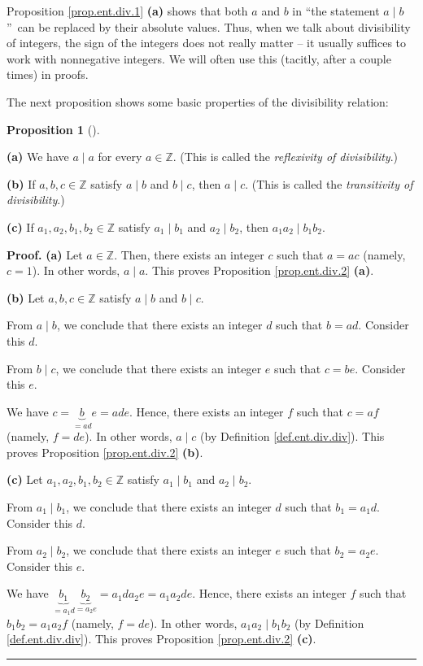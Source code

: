 \documentclass[numbers=enddot,12pt,final,onecolumn,notitlepage]{scrartcl}%
\numberwithin{exer}{subsection}
\theoremstyle{definition}
\newtheorem{prop}[theo]{Proposition}
\newenvironment{proposition}[1][]
{\begin{prop}[#1]\begin{leftbar}}
{\end{leftbar}\end{prop}}
\newenvironment{proof}[1][Proof]{\noindent\textbf{#1.} }{\ \rule{0.5em}{0.5em}}
\begin{document}
Proposition \ref{prop.ent.div.1} \textbf{(a)} shows that both $a$ and $b$ in
\textquotedblleft the statement $a\mid b$\textquotedblright\ can be replaced
by their absolute values. Thus, when we talk about divisibility of integers,
the sign of the integers does not really matter -- it usually suffices to work
with nonnegative integers. We will often use this (tacitly, after a couple
times) in proofs.

The next proposition shows some basic properties of the divisibility relation:

\begin{proposition}
\label{prop.ent.div.2}\textbf{(a)} We have $a\mid a$ for every $a\in
\mathbb{Z}$. (This is called the \textit{reflexivity of divisibility}.)

\textbf{(b)} If $a,b,c\in\mathbb{Z}$ satisfy $a\mid b$ and $b\mid c$, then
$a\mid c$. (This is called the \textit{transitivity of divisibility}.)

\textbf{(c)} If $a_{1},a_{2},b_{1},b_{2}\in\mathbb{Z}$ satisfy $a_{1}\mid
b_{1}$ and $a_{2}\mid b_{2}$, then $a_{1}a_{2}\mid b_{1}b_{2}$.
\end{proposition}

\begin{proof}
\textbf{(a)} Let $a\in\mathbb{Z}$. Then, there exists an integer $c$ such that
$a=ac$ (namely, $c=1$). In other words, $a\mid a$. This proves Proposition
\ref{prop.ent.div.2} \textbf{(a)}.

\textbf{(b)} Let $a,b,c\in\mathbb{Z}$ satisfy $a\mid b$ and $b\mid c$.

From $a\mid b$, we conclude that there exists an integer $d$ such that $b=ad$.
Consider this $d$.

From $b\mid c$, we conclude that there exists an integer $e$ such that $c=be$.
Consider this $e$.

We have $c=\underbrace{b}_{=ad}e=ade$. Hence, there exists an integer $f$ such
that $c=af$ (namely, $f=de$). In other words, $a\mid c$ (by Definition
\ref{def.ent.div.div}). This proves Proposition \ref{prop.ent.div.2}
\textbf{(b)}.

\textbf{(c)} Let $a_{1},a_{2},b_{1},b_{2}\in\mathbb{Z}$ satisfy $a_{1}\mid
b_{1}$ and $a_{2}\mid b_{2}$.

From $a_{1}\mid b_{1}$, we conclude that there exists an integer $d$ such that
$b_{1}=a_{1}d$. Consider this $d$.

From $a_{2}\mid b_{2}$, we conclude that there exists an integer $e$ such that
$b_{2}=a_{2}e$. Consider this $e$.

We have $\underbrace{b_{1}}_{=a_{1}d}\underbrace{b_{2}}_{=a_{2}e}=a_{1}%
da_{2}e=a_{1}a_{2}de$. Hence, there exists an integer $f$ such that
$b_{1}b_{2}=a_{1}a_{2}f$ (namely, $f=de$). In other words, $a_{1}a_{2}\mid
b_{1}b_{2}$ (by Definition \ref{def.ent.div.div}). This proves Proposition
\ref{prop.ent.div.2} \textbf{(c)}.
\end{proof}
\end{document}
